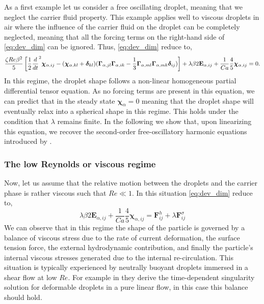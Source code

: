 As a first example let us consider a free oscillating droplet, meaning that we neglect the carrier fluid property. 
This example applies well to viscous droplets in air where the influence of the carrier fluid on the droplet can be completely neglected, meaning that all the forcing terms on the right-hand side of \ref{eq:dev_dim} can be ignored. 
Thus, \ref{eq:dev_dim} reduce to, 
\begin{multline}
    \frac{\zeta Re \beta^2}{5}
    \left[
        \frac{1}{2}\frac{d}{dt}^2 \bm\chi_{\alpha,ij}
        -  ( \bm\chi_{\alpha,kl} +\bm\delta_{kl})
        (\bm\Gamma_{\alpha,jl}\bm\Gamma_{\alpha,ik}  
        - \frac{1}{3}
        \bm\Gamma_{\alpha,ml}\bm\Gamma_{\alpha,mk}  
        \bm\delta_{ij}
        )
    \right]
    + \lambda \beta 2 \textbf{E}_{\alpha,ij}
    + \frac{1}{Ca}
    \frac{4  }{5} \bm\chi_{\alpha,ij}
    =
    0.
\end{multline}
In this regime, the droplet shape follows a non-linear homogeneous partial differential tensor equation. 
As no forcing terms are present in this equation, we can predict that in the steady state $\bm\chi_\alpha = 0$ meaning that the droplet shape will eventually relax into a spherical shape in this regime.
This holds under the condition that $\lambda$ remains finite.   
In the following we show that, upon linearizing this equation, we recover the second-order free-oscillatory harmonic equations introduced by \citet{lamb1924hydrodynamics}. 

\subsubsection{The low Reynolds or viscous regime}

Now, let us assume that the relative motion between the droplets and the carrier phase is rather viscous such that $Re \ll 1$.
In this situation \ref{eq:dev_dim} reduce to, 
\begin{equation*}
    \lambda \beta 2 \textbf{E}_{\alpha,ij}
    + \frac{1}{Ca}
    \frac{4  }{5} \bm\chi_{\alpha,ij}
    = \textbf{F}_{ij}^h 
    + \lambda \textbf{F}_{ij}^{\sigma}
    \label{eq:stokes_shape}
\end{equation*}
We can observe that in this regime the shape of the particle is governed by a balance of viscous stress due to the rate of current deformation, the surface tension force, the external hydrodynamic contribution, and finally the particle's internal viscous stresses generated due to the internal re-circulation. 
This situation is typically experienced by neutrally buoyant droplets immersed in a shear flow at low $Re$. 
For example in \citet[Chapter 7]{leal2007advanced} they derive the time-dependent singularity solution for deformable droplets in a pure linear flow, in this case this balance should hold. 


